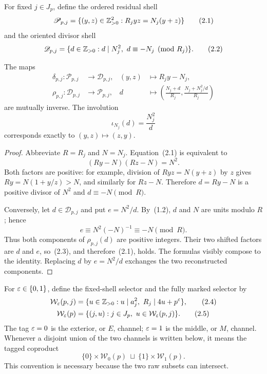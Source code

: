 For fixed \(j\in J_p\), define the ordered residual shell
\begin{equation}
 \mathscr P_{p,j}=
 \{(y,z)\in\mathbb Z_{>0}^2:R_jyz=N_j(y+z)\}                         \tag{2.1}
\end{equation}
and the oriented divisor shell
\begin{equation}
 \mathscr D_{p,j}=
 \{d\in\mathbb Z_{>0}:d\mid N_j^2,\ d\equiv-N_j\pmod {R_j}\}.       \tag{2.2}
\end{equation}

\begin{proposition}\label{prop:esksb-shell-bijection}
The maps
\begin{align*}
 \delta_{p,j}:\mathscr P_{p,j}&\longrightarrow\mathscr D_{p,j},
 &(y,z)&\longmapsto R_jy-N_j,\\
 \rho_{p,j}:\mathscr D_{p,j}&\longrightarrow\mathscr P_{p,j},
 &d&\longmapsto
 \left(\frac{N_j+d}{R_j},
       \frac{N_j+N_j^2/d}{R_j}\right)
\end{align*}
are mutually inverse.  The involution
\[
 \iota_{N_j}(d)=\frac{N_j^2}{d}
\]
corresponds exactly to \((y,z)\mapsto(z,y)\).
\end{proposition}

\begin{proof}
Abbreviate \(R=R_j\) and \(N=N_j\).  Equation~(2.1) is equivalent to
\begin{equation}
 (Ry-N)(Rz-N)=N^2.                                            \tag{2.3}
\end{equation}
Both factors are positive: for example, division of
\(Ryz=N(y+z)\) by \(z\) gives \(Ry=N(1+y/z)>N\), and similarly for
\(Rz-N\).  Therefore \(d=Ry-N\) is a positive divisor of \(N^2\) and
\(d\equiv-N\pmod R\).

Conversely, let \(d\in\mathscr D_{p,j}\) and put \(e=N^2/d\).  By~(1.2),
\(d\) and \(N\) are units modulo \(R\); hence
\[
 e\equiv N^2(-N)^{-1}\equiv-N\pmod R.
\]
Thus both components of \(\rho_{p,j}(d)\) are positive integers.  Their
 two shifted factors are \(d\) and \(e\), so~(2.3), and therefore~(2.1),
 holds.  The formulas visibly compose to the identity.  Replacing \(d\) by
\(e=N^2/d\) exchanges the two reconstructed components.
\end{proof}

For \(\varepsilon\in\{0,1\}\), define the fixed-shell selector and the fully marked
selector by
\begin{align}
 \mathcal W_\eps(p,j)
 &=\{u\in\ZZpos:u\mid a_j^2,\ R_j\mid4u+p^\eps\},             \tag{2.4}\\
 \mathcal W_\eps(p)
 &=\{(j,u):j\in J_p,\ u\in\mathcal W_\eps(p,j)\}.           \tag{2.5}
\end{align}
The tag \(\varepsilon=0\) is the exterior, or \(E\), channel; \(\varepsilon=1\) is the
middle, or \(M\), channel.
Whenever a disjoint union of the two channels is written below, it means the
tagged coproduct
\[
 \{0\}\times\mathcal W_0(p)\ \sqcup\
 \{1\}\times\mathcal W_1(p).
\]
This convention is necessary because the two raw subsets can intersect.

